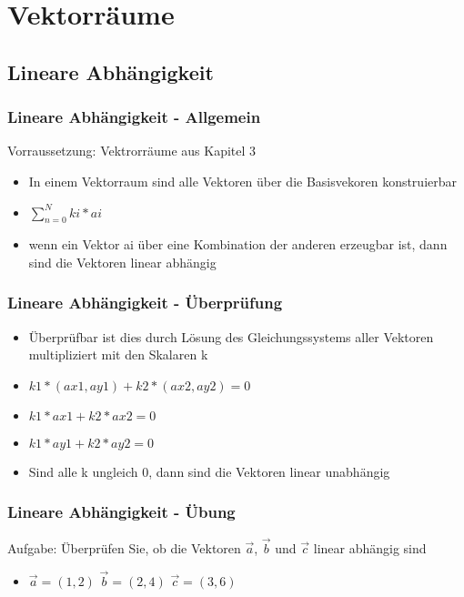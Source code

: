 \section{Vektorräume}
\subsection{Lineare Abhängigkeit}
\begin{frame}
    \frametitle{Lineare Abhängigkeit - Allgemein}
    Vorraussetzung: Vektrorräume aus Kapitel 3
    \begin{itemize}
        \item In einem Vektorraum sind alle Vektoren über die Basisvekoren konstruierbar
        \item $\sum\nolimits_{n=0}^N ki * ai$ 
        \item wenn ein Vektor ai über eine Kombination der anderen erzeugbar ist, dann sind die Vektoren linear abhängig
        
    \end{itemize}
\end{frame}

\begin{frame}
    \frametitle{Lineare Abhängigkeit - Überprüfung}
    \begin{itemize}
        \item Überprüfbar ist dies durch Lösung des Gleichungssystems aller Vektoren multipliziert mit den Skalaren k
        \item $k1 * (ax1, ay1) + k2* (ax2, ay2) = 0$ 
        \item $k1 * ax1 + k2* ax2 = 0$
        \item $k1 * ay1 + k2* ay2 = 0$
        \item Sind alle k ungleich 0, dann sind die Vektoren linear unabhängig
    \end{itemize}
\end{frame}

\begin{frame}
    \frametitle{Lineare Abhängigkeit - Übung}
    Aufgabe: Überprüfen Sie, ob die Vektoren $\vec{a}$, $\vec{b}$ und $\vec{c}$ linear abhängig sind
    \begin{itemize}
        \item $\vec{a} = (1, 2)$ $\vec{b} = (2, 4)$ $\vec{c} = (3, 6)$
        
    \end{itemize}
\end{frame}

